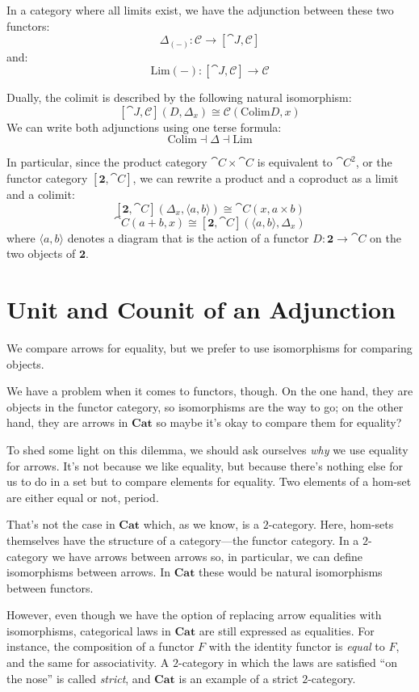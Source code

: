 \documentclass[DaoFP]{subfiles}
\begin{document}
In a category where all limits exist, we have the adjunction between these two functors:
\[ \Delta_{(-)} \colon \mathcal{C} \to  [\cat J, \mathcal{C}] \]
and:
\[ \text{Lim}{(-)} \colon  [\cat J, \mathcal{C}] \to \mathcal{C} \]

Dually, the colimit is described by the following natural isomorphism:
\[ [\cat J, \mathcal{C}](D, \Delta_x)  \cong \mathcal{C}( \text{Colim} D, x) \]
We can write both adjunctions using one terse formula:
\[ \text{Colim} \dashv \Delta \dashv \text{Lim}\]

In particular, since the product category $\cat C \times \cat C$ is equivalent to $\cat C^2$, or the functor category $[\mathbf{2}, \cat C]$, we can rewrite a product and a coproduct as a limit and a colimit:
\[ [\mathbf{2}, \cat C](\Delta_x, \langle a, b \rangle) \cong \cat C(x, a \times b) \]
\[ \cat C( a + b, x) \cong [\mathbf{2}, \cat C]( \langle a, b \rangle, \Delta_x) \]
where $\langle a, b \rangle$ denotes a diagram that is the action of a functor $D \colon \mathbf{2} \to \cat C$ on the two objects of $\mathbf{2}$.

\section{Unit and Counit of an Adjunction}

We compare arrows for equality, but we prefer to use isomorphisms for comparing objects. 

We have a problem when it comes to functors, though. On the one hand, they are objects in the functor category, so isomorphisms are the way to go; on the other hand, they are arrows in $\mathbf{Cat}$ so maybe it's okay to compare them for equality?

To shed some light on this dilemma, we should ask ourselves \emph{why} we use equality for arrows. It's not because we like equality, but because there's nothing else for us to do in a set but to compare elements for equality. Two elements of a hom-set are either equal or not, period. 

That's not the case in  $\mathbf{Cat}$ which, as we know, is a $2$-category. Here, hom-sets themselves have the structure of a category---the functor category. In a $2$-category we have arrows between arrows so, in particular, we can define isomorphisms between arrows. In $\mathbf{Cat}$ these would be natural isomorphisms between functors.

However, even though we have the option of replacing arrow equalities with isomorphisms, categorical laws in $\mathbf{Cat}$ are still expressed as equalities. For instance, the composition of a functor $F$ with the identity functor is \emph{equal} to $F$, and the same for associativity. A $2$-category in which the laws are satisfied ``on the nose'' is called \emph{strict}, and $\mathbf{Cat}$ is an example of a strict $2$-category. 
\end{document}
